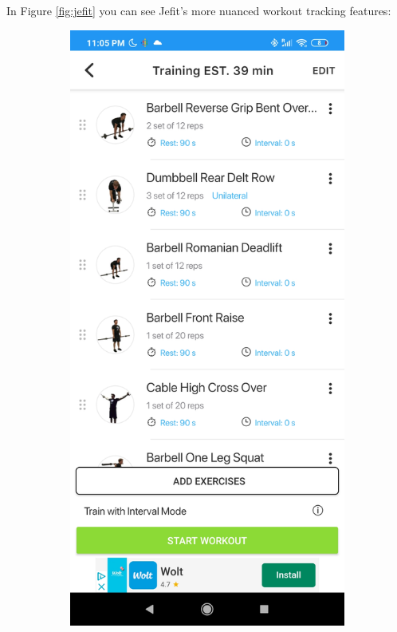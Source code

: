 \documentclass{l4proj}
\begin{document}
In Figure \ref{fig:jefit} you can see Jefit's more nuanced workout tracking features:
\begin{figure}[H]
    \begin{subfigure}{0.45\textwidth}
        \includegraphics[width=\textwidth]{jefit_1.png}

\end{subfigure}
\end{figure}
\end{document}
